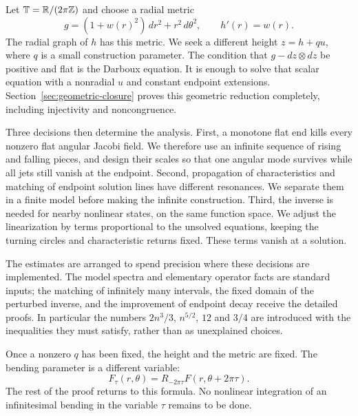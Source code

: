 Let $\mathbb T=\mathbb R/(2\pi\mathbb Z)$ and choose a radial metric
\[
 g=(1+w(r)^2)\,dr^2+r^2\,d\theta^2,
 \qquad h'(r)=w(r).
\]
The radial graph of $h$ has this metric. We seek a different height
$z=h+qu$, where $q$ is a small construction parameter. The condition
that $g-dz\otimes dz$ be positive and flat is the Darboux equation.
It is enough to solve that scalar equation with a nonradial $u$ and
constant endpoint extensions. Section~\ref{sec:geometric-closure}
proves this geometric reduction completely, including injectivity
and noncongruence.

Three decisions then determine the analysis. First, a monotone flat
end kills every nonzero flat angular Jacobi field. We therefore use
an infinite sequence of rising and falling pieces, and design their
scales so that one angular mode survives while all jets still vanish
at the endpoint. Second, propagation of characteristics and matching
of endpoint solution lines have different resonances. We separate
them in a finite model before making the infinite construction.
Third, the inverse is needed for nearby nonlinear states, on the
same function space. We adjust the linearization by terms
proportional to the unsolved equations, keeping the turning circles
and characteristic returns fixed. These terms vanish at a solution.

The estimates are arranged to spend precision where these decisions
are implemented. The model spectra and elementary operator facts
are standard inputs; the matching of infinitely many intervals,
the fixed domain of the perturbed inverse, and the improvement of
endpoint decay receive the detailed proofs. In particular the
numbers $2n^3/3$, $n^{5/2}$, $12$ and $3/4$ are introduced with the
inequalities they must satisfy, rather than as unexplained choices.

Once a nonzero $q$ has been fixed, the height and the metric are fixed.
The bending parameter is a different variable:
\begin{equation}\label{eq:phase-family}
 F_\tau(r,\theta)=R_{-2\pi\tau}F(r,\theta+2\pi\tau).
\end{equation}
The rest of the proof returns to this formula. No nonlinear
integration of an infinitesimal bending in the variable $\tau$
remains to be done.
